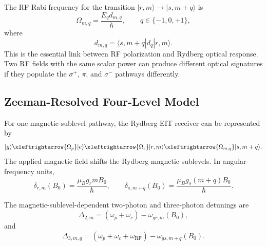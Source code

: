 \documentclass{ieeeaccess}
\begin{document}
The RF Rabi frequency for the transition \(|r,m\rangle\rightarrow|s,m+q\rangle\) is
\begin{equation}
\Omega_{m,q}
=
\frac{E_q d_{m,q}}{\hbar},
\qquad
q\in\{-1,0,+1\},
\label{eq:annex_rabi_polarized}
\end{equation}
where
\begin{equation}
d_{m,q}
=
\langle s,m+q|d_q|r,m\rangle.
\label{eq:annex_dipole_component}
\end{equation}
This is the essential link between RF polarization and Rydberg optical response. Two RF fields with the same scalar power can produce different optical signatures if they populate the \(\sigma^+\), \(\pi\), and \(\sigma^-\) pathways differently.

\subsection{Zeeman-Resolved Four-Level Model}
\label{annex:zeeman_model}

For one magnetic-sublevel pathway, the Rydberg-EIT receiver can be represented by
\begin{equation}
|g\rangle
\xleftrightarrow{\Omega_p}
|e\rangle
\xleftrightarrow{\Omega_c}
|r,m\rangle
\xleftrightarrow{\Omega_{m,q}}
|s,m+q\rangle.
\label{eq:annex_four_level_pathway}
\end{equation}
The applied magnetic field shifts the Rydberg magnetic sublevels. In angular-frequency units,
\begin{equation}
\delta_{r,m}(B_0)
=
\frac{\mu_B g_r m B_0}{\hbar},
\qquad
\delta_{s,m+q}(B_0)
=
\frac{\mu_B g_s (m+q) B_0}{\hbar}.
\label{eq:annex_zeeman_shifts}
\end{equation}

The magnetic-sublevel-dependent two-photon and three-photon detunings are
\begin{equation}
\Delta_{2,m}
=
(\omega_p+\omega_c)
-
\omega_{gr,m}(B_0),
\label{eq:annex_two_photon_detuning}
\end{equation}
and
\begin{equation}
\Delta_{3,m,q}
=
(\omega_p+\omega_c+\omega_{\mathrm{RF}})
-
\omega_{gs,m+q}(B_0).
\label{eq:annex_three_photon_detuning}
\end{equation}
\end{document}
